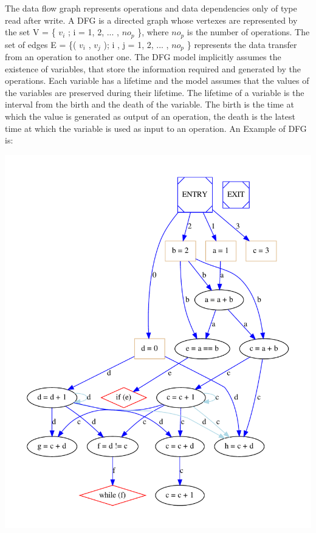 The data flow graph represents operations and data dependencies only of type read after write. A D\+FG is a directed graph whose vertexes are represented by the set V = \{ $v_i$ ; i = 1, 2, ... , $no_p$ \}, where $no_p$ is the number of operations. The set of edges E = \{( $v_i$ , $v_j$ ); i , j = 1, 2, ... , $no_p$ \} represents the data transfer from an operation to another one. The D\+FG model implicitly assumes the existence of variables, that store the information required and generated by the operations. Each variable has a lifetime and the model assumes that the values of the variables are preserved during their lifetime. The lifetime of a variable is the interval from the birth and the death of the variable. The birth is the time at which the value is generated as output of an operation, the death is the latest time at which the variable is used as input to an operation. An Example of D\+FG is\+: 
\begin{DoxyImageNoCaption}
  \mbox{\includegraphics[width=\textwidth,height=\textheight/2,keepaspectratio=true]{dot_inline_dotgraph_4}}
\end{DoxyImageNoCaption}


